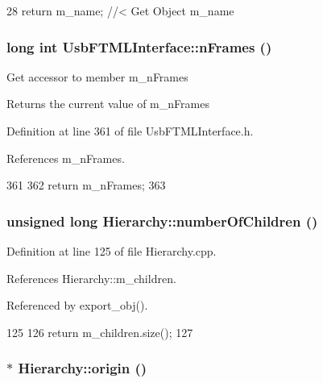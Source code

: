 \begin{DoxyCode}
28 { return m_name; } //< Get Object m_name
\end{DoxyCode}
\hypertarget{classUsbFTMLInterface_a55531536a54b736b9c9c38bb792ec4c9}{
\subsubsection[{nFrames}]{\setlength{\rightskip}{0pt plus 5cm}long int UsbFTMLInterface::nFrames ()}}
\label{classUsbFTMLInterface_a55531536a54b736b9c9c38bb792ec4c9}
Get accessor to member m\_\-nFrames \begin{DoxyReturn}{Returns}
the current value of m\_\-nFrames 
\end{DoxyReturn}


Definition at line 361 of file UsbFTMLInterface.h.

References m\_\-nFrames.


\begin{DoxyCode}
361                       {
362     return m_nFrames;
363   }
\end{DoxyCode}
\hypertarget{classHierarchy_ab16e84de65fd84e14001a6cf941c8be4}{
\subsubsection[{numberOfChildren}]{\setlength{\rightskip}{0pt plus 5cm}unsigned long Hierarchy::numberOfChildren ()}}
\label{classHierarchy_ab16e84de65fd84e14001a6cf941c8be4}


Definition at line 125 of file Hierarchy.cpp.

References Hierarchy::m\_\-children.

Referenced by export\_\-obj().


\begin{DoxyCode}
125                                            {
126   return m_children.size();
127 }
\end{DoxyCode}
\hypertarget{classHierarchy_aee461dc930ce3871636ff87f075b1b83}{
\subsubsection[{origin}]{$\ast$ Hierarchy::origin ()}}
\label{classHierarchy_aee461dc930ce3871636ff87f075b1b83}


